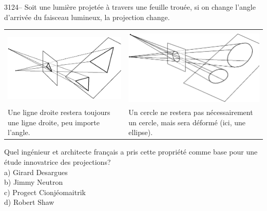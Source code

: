\documentclass[letterpaper, 12pt]{article}
\begin{document}
3124-- Soit une lumi\`ere projet\'ee \`a travers une feuille trou\'ee, si on change l'angle d'arriv\'ee du faisceau lumineux, la projection change.
\begin{center}
\begin{tabular}{|p{8cm}|p{8cm}|} \hline
& \\
\includegraphics[scale=0.2]{perspective2.eps} & \includegraphics[scale=0.2]{perspectivecercle.eps}\\ \hline
Une ligne droite restera toujours une ligne droite, peu importe l'angle. & Un cercle ne restera pas n\'ecessairement un cercle, mais sera d\'eform\'e (ici, une ellipse).\\ \hline
\end{tabular}
\end{center}


Quel ing\'enieur et architecte fran\c cais a pris cette propri\'et\'e comme base pour une \'etude innovatrice des projections?\\

a) Girard Desargues\\
b) Jimmy Neutron\\
c) Progect Cionj\'eomaitrik\\
d) Robert Shaw\\
\end{document}
